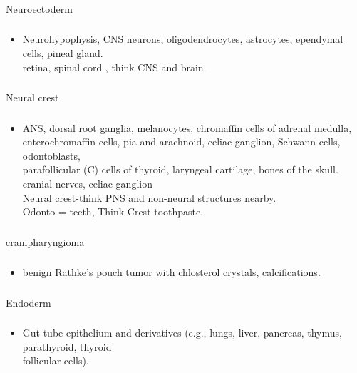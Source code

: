 \documentclass[11pt]{beamer}
\begin{document}
\begin{frame}
 \frametitle{}
Neuroectoderm
\end{frame}

\begin{frame}
 \frametitle{}
\begin{itemize}
\item{Neurohypophysis, CNS neurons, oligodendrocytes, astrocytes, ependymal cells, pineal gland. \\ retina, spinal cord , think CNS and brain. }
\end{itemize}
\end{frame}

\begin{frame}
 \frametitle{}
Neural crest
\end{frame}

\begin{frame}
 \frametitle{}
\begin{itemize}
\item{ANS, dorsal root ganglia, melanocytes, chromaffin cells of adrenal medulla, \\ enterochromaffin cells, pia and arachnoid, celiac ganglion, Schwann cells, odontoblasts, \\ parafollicular (C) cells of thyroid, laryngeal cartilage, bones of the skull. \\ cranial nerves, celiac ganglion \\ Neural crest-think PNS and non-neural structures nearby. \\ Odonto = teeth, Think Crest toothpaste. }
\end{itemize}
\end{frame}

\begin{frame}
 \frametitle{}
cranipharyngioma 
\end{frame}

\begin{frame}
 \frametitle{}
\begin{itemize}
\item{benign Rathke's pouch tumor with chlosterol crystals, calcifications. }
\end{itemize}
\end{frame}

\begin{frame}
 \frametitle{}
Endoderm
\end{frame}

\begin{frame}
 \frametitle{}
\begin{itemize}
\item{Gut tube epithelium and derivatives (e.g., lungs, liver, pancreas, thymus, parathyroid, thyroid \\ follicular cells).}
\end{itemize}
\end{frame}
\end{document}
